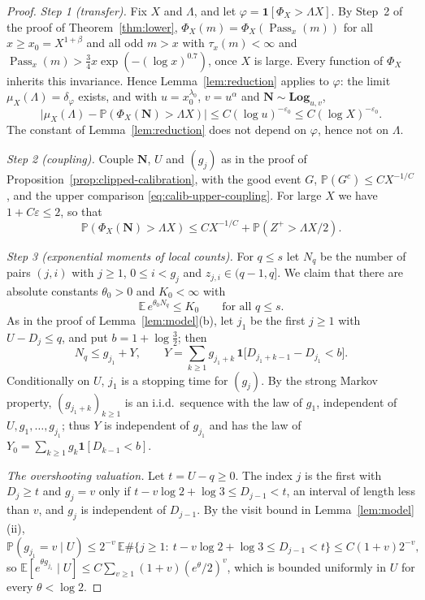 \documentclass[12pt]{amsart}
\theoremstyle{definition}
\theoremstyle{remark}
\begin{document}
\begin{proof}
\emph{Step 1 (transfer).} Fix $X$ and $\Lambda$, and let
$\varphi=\mathbf 1[\Phi_X>\Lambda X]$. By Step~2 of the proof of
Theorem~\ref{thm:lower}, $\Phi_X(m)=\Phi_X(\operatorname{Pass}_x(m))$ for
all $x\ge x_0=X^{1+\beta}$ and all odd $m>x$ with $\tau_x(m)<\infty$ and
$\operatorname{Pass}_x(m)>\frac34x\exp(-(\log x)^{0.7})$, once $X$ is
large. Every function of $\Phi_X$ inherits this invariance. Hence
Lemma~\ref{lem:reduction} applies to $\varphi$: the limit
$\mu_X(\Lambda)=\delta_\varphi$ exists, and with $u=x_0^{\lambda_0}$,
$v=u^\alpha$ and $\mathbf N\sim\mathbf{Log}_{u,v}$,
\[
 \bigl|\mu_X(\Lambda)-\mathbb P(\Phi_X(\mathbf N)>\Lambda X)\bigr|
 \le C(\log u)^{-\varepsilon_0}\le C(\log X)^{-\varepsilon_0}.
\]
The constant of Lemma~\ref{lem:reduction} does not depend on
$\varphi$, hence not on $\Lambda$.

\emph{Step 2 (coupling).} Couple $\mathbf N$, $U$ and $(g_j)$ as in the
proof of Proposition~\ref{prop:clipped-calibration}, with the good event
$G$, $\mathbb P(G^c)\le CX^{-1/C}$, and the upper comparison
\eqref{eq:calib-upper-coupling}. For large $X$ we have
$1+C\varepsilon\le2$, so that
\[
 \mathbb P(\Phi_X(\mathbf N)>\Lambda X)
 \le CX^{-1/C}+\mathbb P(Z^+>\Lambda X/2).
\]

\emph{Step 3 (exponential moments of local counts).} For $q\le s$ let
$N_q$ be the number of pairs $(j,i)$ with $j\ge1$, $0\le i<g_j$ and
$z_{j,i}\in(q-1,q]$. We claim that there are absolute constants
$\theta_0>0$ and $K_0<\infty$ with
\begin{equation}\label{eq:local-exp-moment}
 \mathbb E\,e^{\theta_0N_q}\le K_0\qquad\text{for all }q\le s.
\end{equation}
As in the proof of Lemma~\ref{lem:model}(b), let $j_1$ be the first
$j\ge1$ with $U-D_j\le q$, and put $b=1+\log\frac32$; then
\[
 N_q\le g_{j_1}+Y,\qquad
 Y=\sum_{k\ge1}g_{j_1+k}\,\mathbf 1\bigl[D_{j_1+k-1}-D_{j_1}<b\bigr].
\]
Conditionally on $U$, $j_1$ is a stopping time for $(g_j)$. By the strong
Markov property, $(g_{j_1+k})_{k\ge1}$ is an i.i.d.\ sequence with the
law of $g_1$, independent of $U,g_1,\ldots,g_{j_1}$; thus $Y$ is
independent of $g_{j_1}$ and has the law of
$Y_0=\sum_{k\ge1}g_k\mathbf 1[D_{k-1}<b]$.

\emph{The overshooting valuation.} Let $t=U-q\ge0$. The index $j$ is the
first with $D_j\ge t$ and $g_j=v$ only if
$t-v\log2+\log3\le D_{j-1}<t$, an interval of length less than $v$, and
$g_j$ is independent of $D_{j-1}$. By the visit bound in
Lemma~\ref{lem:model}(ii),
\[
 \mathbb P(g_{j_1}=v\mid U)\le 2^{-v}\,
 \mathbb E\#\{j\ge1:\ t-v\log2+\log3\le D_{j-1}<t\}
 \le C(1+v)2^{-v},
\]
so $\mathbb E[e^{\theta g_{j_1}}\mid U]\le C\sum_{v\ge1}(1+v)(e^\theta/2)^v$,
which is bounded uniformly in $U$ for every $\theta<\log2$.


\end{proof}
\end{document}
